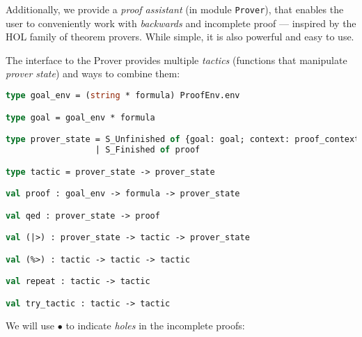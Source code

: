 \documentclass[english, mgr]{iithesis}
\begin{document}
Additionally, we provide a \textit{proof assistant} (in module \texttt{Prover}),
that enables the user to conveniently work with \textit{backwards} and incomplete
proof --- inspired by the HOL family of theorem provers.
While simple, it is also powerful and easy to use.

The interface to the Prover provides multiple \textit{tactics}
(functions that manipulate \textit{prover state}) and ways to combine them:
\begin{lstlisting}[language=OCaml]
type goal_env = (string * formula) ProofEnv.env

type goal = goal_env * formula

type prover_state = S_Unfinished of {goal: goal; context: proof_context}
                  | S_Finished of proof

type tactic = prover_state -> prover_state

val proof : goal_env -> formula -> prover_state

val qed : prover_state -> proof

val (|>) : prover_state -> tactic -> prover_state

val (%>) : tactic -> tactic -> tactic

val repeat : tactic -> tactic

val try_tactic : tactic -> tactic
\end{lstlisting}
\newcommand{\hole}{\ensuremath{\bullet}}
We will use $\hole$ to indicate \textit{holes} in the incomplete proofs:
\end{document}
